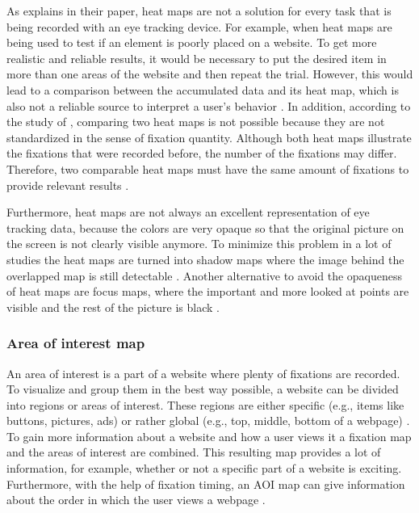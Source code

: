 As \textcite[]{bojko2009informative} explains in their paper, heat maps are not a solution for every task that is being recorded with an eye tracking device. 
For example, when heat maps are being used to test if an element is poorly placed on a website. To get more realistic and reliable results, it would be necessary to put the desired item in more than one areas of the website and then repeat the trial. However, this would lead to a comparison between the accumulated data and its heat map, which is also not a reliable source to interpret a user's behavior \autocite[]{bojko2009informative}. 
In addition, according to the study of \textcite[]{djamasbi2010efficiency}, comparing two heat maps is not possible because they are not standardized in the sense of fixation quantity. Although both heat maps illustrate the fixations that were recorded before, the number of the fixations may differ. Therefore, two comparable heat maps must have the same amount of fixations to provide relevant results \autocite[]{djamasbi2010efficiency}. 

Furthermore, heat maps are not always an excellent representation of eye tracking data, because the colors are very opaque so that the original picture on the screen is not clearly visible anymore. To minimize this problem in a lot of studies the heat maps are turned into shadow maps where the image behind the overlapped map is still detectable \autocite[]{vspakov2007visualization}. Another alternative to avoid the opaqueness of heat maps are focus maps, where the important and more looked at points are visible and the rest of the picture is black \autocite{kruger2014subtitles}.

\subsubsection{Area of interest map}
An area of interest is a part of a website where plenty of fixations are recorded. To visualize and group them in the best way possible, a website can be divided into regions or areas of interest. These regions are either specific (e.g., items like buttons, pictures, ads) or rather global (e.g., top, middle, bottom of a webpage) \autocite[]{gonzalez2011different, djamasbi2014eye}. To gain more information about a website and how a user views it a fixation map and the areas of interest are combined. This resulting map provides a lot of information, for example, whether or not a specific part of a website is exciting. Furthermore, with the help of fixation timing, an AOI map can give information about the order in which the user views a webpage \autocite[]{djamasbi2014eye}.

